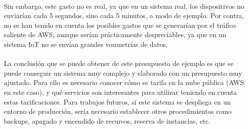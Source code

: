 \documentclass[../../memoria.tex]{subfiles}
\begin{document}
\paragraph{}
Sin embargo, este gasto no es real, ya que en un sistema real, los dispositivos no enviarían cada 5 segundos, sino cada 5 minutos, a modo de ejemplo. Por contra, no se han tenido en cuenta los posibles gastos que se generarían por el tráfico saliente de AWS, aunque serían prácticamente despreciables, ya que en un sistema IoT no se envían grandes voumetrías de datos.

\paragraph{}
La conclusión que se puede obtener de este presupuesto de ejemplo es que se puede conseguir un sistema muy complejo y elaborado con un presupuesto muy ajustado. Para ello es necesario conocer cómo se tarifa en la nube pública (AWS en este caso), y qué servicios son interesantes para utilizar teniendo en cuenta estas tarificaciones. Para trabajos futuros, si este sistema se despliega en un entorno de producción, sería necesario establecer otros procedimientos como backups, apagado y encendido de recursos, reserva de instancias, etc.
\end{document}
